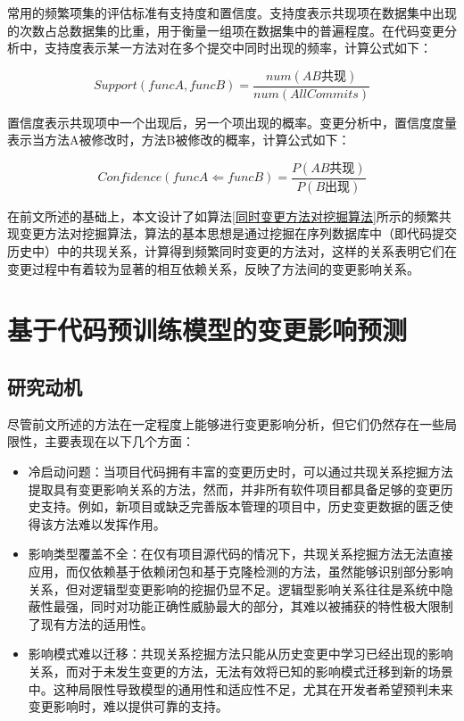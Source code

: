 常用的频繁项集的评估标准有支持度和置信度。支持度表示共现项在数据集中出现的次数占总数据集的比重，用于衡量一组项在数据集中的普遍程度。在代码变更分析中，支持度表示某一方法对在多个提交中同时出现的频率，计算公式如下：

\begin{equation}
\label{1_Support}
Support(funcA,funcB)=\frac{num(AB\text{共现})}{num(AllCommits)}
\end{equation}

置信度表示共现项中一个出现后，另一个项出现的概率。变更分析中，置信度度量表示当方法A被修改时，方法B被修改的概率，计算公式如下：

\begin{equation}
\label{1_Confidence}
Confidence(funcA\Leftarrow funcB)=\frac{P(AB\text{共现})}{P(B\text{出现})}
\end{equation}

在前文所述的基础上，本文设计了如算法\ref{同时变更方法对挖掘算法}所示的频繁共现变更方法对挖掘算法，算法的基本思想是通过挖掘在序列数据库中（即代码提交历史中）中的共现关系，计算得到频繁同时变更的方法对，这样的关系表明它们在变更过程中有着较为显著的相互依赖关系，反映了方法间的变更影响关系。

\section{基于代码预训练模型的变更影响预测}
\subsection{研究动机}

尽管前文所述的方法在一定程度上能够进行变更影响分析，但它们仍然存在一些局限性，主要表现在以下几个方面：

\begin{itemize}

    \item 冷启动问题：当项目代码拥有丰富的变更历史时，可以通过共现关系挖掘方法提取具有变更影响关系的方法，然而，并非所有软件项目都具备足够的变更历史支持。例如，新项目或缺乏完善版本管理的项目中，历史变更数据的匮乏使得该方法难以发挥作用。

    \item 影响类型覆盖不全：在仅有项目源代码的情况下，共现关系挖掘方法无法直接应用，而仅依赖基于依赖闭包和基于克隆检测的方法，虽然能够识别部分影响关系，但对逻辑型变更影响的挖掘仍显不足。逻辑型影响关系往往是系统中隐蔽性最强，同时对功能正确性威胁最大的部分，其难以被捕获的特性极大限制了现有方法的适用性。
    
    \item 影响模式难以迁移：共现关系挖掘方法只能从历史变更中学习已经出现的影响关系，而对于未发生变更的方法，无法有效将已知的影响模式迁移到新的场景中。这种局限性导致模型的通用性和适应性不足，尤其在开发者希望预判未来变更影响时，难以提供可靠的支持。
    
\end{itemize}


